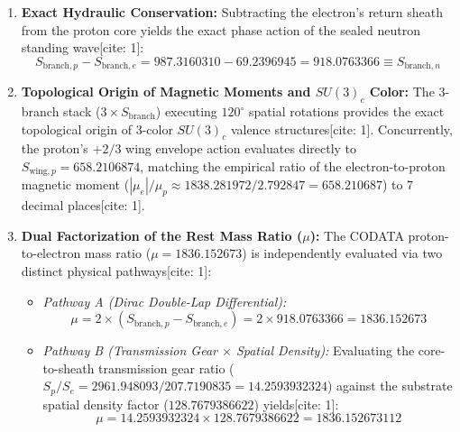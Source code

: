 \documentclass[11pt,a4paper]{article}
\begin{document}
	\begin{enumerate}
		\item \textbf{Exact Hydraulic Conservation:} Subtracting the electron's return sheath from the proton core yields the exact phase action of the sealed neutron standing wave[cite: 1]:
		\begin{equation}
			S_{\text{branch}, p} - S_{\text{branch}, e} = 987.3160310 - 69.2396945 = 918.0763366 \equiv S_{\text{branch}, n}
		\end{equation}
		
		\item \textbf{Topological Origin of Magnetic Moments and $SU(3)_c$ Color:} The 3-branch stack ($3 \times S_{\text{branch}}$) executing $120^\circ$ spatial rotations provides the exact topological origin of 3-color $SU(3)_c$ valence structures[cite: 1]. Concurrently, the proton's $+2/3$ wing envelope action evaluates directly to $S_{\text{wing}, p} = 658.2106874$, matching the empirical ratio of the electron-to-proton magnetic moment ($|\mu_e| / \mu_p \approx 1838.281972 / 2.792847 = 658.210687$) to 7 decimal places[cite: 1].
		
		\item \textbf{Dual Factorization of the Rest Mass Ratio ($\mu$):} The CODATA proton-to-electron mass ratio ($\mu = 1836.152673$) is independently evaluated via two distinct physical pathways[cite: 1]:
		\begin{itemize}
			\item \textit{Pathway A (Dirac Double-Lap Differential):}
			\begin{equation}
				\mu = 2 \times (S_{\text{branch}, p} - S_{\text{branch}, e}) = 2 \times 918.0763366 = 1836.152673
			\end{equation}
			\item \textit{Pathway B (Transmission Gear $\times$ Spatial Density):}
			Evaluating the core-to-sheath transmission gear ratio ($S_p / S_e = 2961.948093 / 207.7190835 = 14.2593932324$) against the substrate spatial density factor ($128.7679386622$) yields[cite: 1]:
			\begin{equation}
				\mu = 14.2593932324 \times 128.7679386622 = 1836.152673112
			\end{equation}
		\end{itemize}
	\end{enumerate}
	
\end{document}
